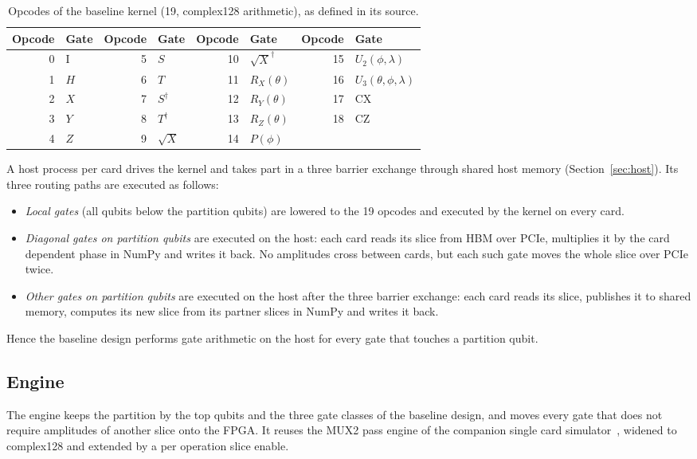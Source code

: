 \documentclass[pdflatex,sn-mathphys-num]{sn-jnl}
\theoremstyle{thmstyleone}
\theoremstyle{thmstylethree}
\begin{document}
\begin{table}[t]
\caption{Opcodes of the baseline kernel (19, complex128 arithmetic), as defined in its source.}\label{tab:opcodes}
\begin{tabular}{@{}rlrlrlrl@{}}
\toprule
Opcode & Gate & Opcode & Gate & Opcode & Gate & Opcode & Gate \\
\midrule
0 & I & 5 & $S$ & 10 & $\sqrt{X}^\dagger$ & 15 & $U_2(\phi,\lambda)$ \\
1 & $H$ & 6 & $T$ & 11 & $R_X(\theta)$ & 16 & $U_3(\theta,\phi,\lambda)$ \\
2 & $X$ & 7 & $S^\dagger$ & 12 & $R_Y(\theta)$ & 17 & CX \\
3 & $Y$ & 8 & $T^\dagger$ & 13 & $R_Z(\theta)$ & 18 & CZ \\
4 & $Z$ & 9 & $\sqrt{X}$ & 14 & $P(\phi)$ & & \\
\bottomrule
\end{tabular}
\end{table}
 A host process per card drives the kernel and takes part in a
three barrier exchange through shared host memory (Section~\ref{sec:host}). Its three routing paths are executed as
follows:
\begin{itemize}
\item \emph{Local gates} (all qubits below the partition qubits) are lowered to the 19 opcodes and executed by the
kernel on every card.
\item \emph{Diagonal gates on partition qubits} are executed on the host: each card reads its slice from HBM over
PCIe, multiplies it by the card dependent phase in NumPy and writes it back. No amplitudes cross between cards, but
each such gate moves the whole slice over PCIe twice.
\item \emph{Other gates on partition qubits} are executed on the host after the three barrier exchange: each card
reads its slice, publishes it to shared memory, computes its new slice from its partner slices in NumPy and writes it
back.
\end{itemize}
Hence the baseline design performs gate arithmetic on the host for every gate that touches a partition qubit.

\subsection{Engine}\label{subsec:engine}

The engine keeps the partition by the top qubits and the three gate classes of the baseline design, and
moves every gate that does not require amplitudes of another slice onto the FPGA. It reuses the MUX2 pass engine of the
companion single card simulator~\cite{tiwari2026fpga30}, widened to complex128 and extended by a per operation slice
enable.
\end{document}
